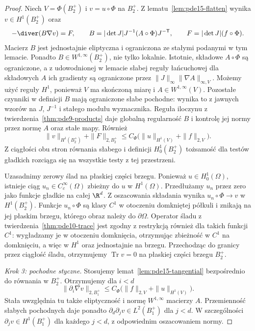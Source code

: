 \begin{proof}
Niech $V=\Phi(B_2^+)$ i $v=u\circ\Phi$ na $B_2^+$.
Z lematu~\ref{lem:pde15-flatten} wynika $v\in H^1(B_2^+)$
oraz
\[
 -\diver(B\nabla v)=F,\qquad
 B=|\det J|J^{-1}(A\circ\Phi)J^{-\mathsf T},\qquad
 F=|\det J|(f\circ\Phi).
\]
Macierz $B$ jest jednostajnie eliptyczna i ograniczona
ze stałymi podanymi w tym lemacie. Ponadto
$B\in W^{1,\infty}(B_2^+)$, nie tylko lokalnie.
Istotnie, składowe $A\circ\Phi$ są ograniczone,
a z udowodnionej w lemacie słabej reguły łańcuchowej
dla składowych $A$ ich gradienty są ograniczone przez
$\|J\|_\infty\|\nabla A\|_{\infty,V}$.
Możemy użyć reguły $H^1$, ponieważ $V$ ma skończoną
miarę i $A\in W^{1,\infty}(V)$.
Pozostałe czynniki w definicji $B$ mają ograniczone
słabe pochodne: wynika to z jawnych wzorów na $J$,
$J^{-1}$ i stałego modułu wyznacznika.
Reguła iloczynu z twierdzenia~\ref{thm:pde9-products}
daje globalną regularność $B$ i kontrolę jej normy
przez normę $A$ oraz stałe mapy. Również
\[
 \|v\|_{H^1(B_2^+)}+\|F\|_{2,B_2^+}
 \le C_\Phi\bigl(\|u\|_{H^1(V)}+\|f\|_{2,V}\bigr).
\]
Z ciągłości obu stron równania słabego i definicji
$H_0^1(B_2^+)$ tożsamość dla testów gładkich
rozciąga się na wszystkie testy z tej przestrzeni.

Uzasadnimy zerowy ślad na płaskiej części brzegu.
Ponieważ $u\in H_0^1(\Omega)$, istnieje ciąg
$u_n\in C_c^\infty(\Omega)$ zbieżny do $u$ w $H^1(\Omega)$.
Przedłużamy $u_n$ przez zero jako funkcje gładkie
na całej $\R^d$. Z oszacowania składania wynika
$u_n\circ\Phi\to v$ w $H^1(B_2^+)$.
Funkcje $u_n\circ\Phi$ są klasy $C^1$ w otoczeniu
domkniętej półkuli i znikają na jej płaskim brzegu,
którego obraz należy do $\partial\Omega$.
Operator śladu z twierdzenia~\ref{thm:pde10-trace}
jest zgodny z restrykcją również dla takich funkcji
$C^1$: wygładzamy je w otoczeniu domknięcia,
otrzymując zbieżność w $C^1$ na domknięciu,
a więc w $H^1$ oraz jednostajnie na brzegu.
Przechodząc do granicy przez ciągłość śladu,
otrzymujemy $\operatorname{Tr}v=0$ na płaskiej części
brzegu $B_2^+$.

\emph{Krok 3: pochodne styczne.}
Stosujemy lemat~\ref{lem:pde15-tangential} bezpośrednio
do równania w $B_2^+$. Otrzymujemy dla $i<d$
\[
 \|\partial_i\nabla v\|_{2,B_1^+}
 \le C_\Phi\bigl(\|f\|_{2,V}+\|u\|_{H^1(V)}\bigr).
\]
Stała uwzględnia tu także eliptyczność i normę
$W^{1,\infty}$ macierzy $A$. Przemienność słabych
pochodnych daje ponadto $\partial_d\partial_jv\in L^2(B_1^+)$
dla $j<d$. W szczególności $\partial_jv\in H^1(B_1^+)$
dla każdego $j<d$, z odpowiednim oszacowaniem normy.


\end{proof}

